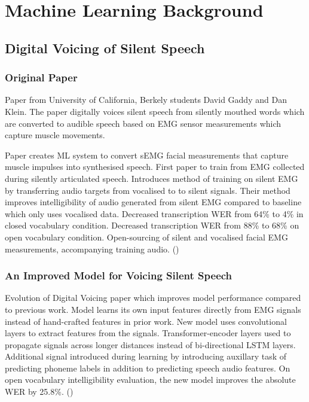 \section{Machine Learning Background}

\subsection{Digital Voicing of Silent Speech}

\subsubsection{Original Paper}

Paper from University of California, Berkely students David Gaddy and Dan Klein.
The paper digitally voices silent speech from silently mouthed words which are
converted to audible speech based on EMG sensor measurements which capture muscle movements.

\iffalse
Other papers have used this approach to FILL REST OF THIS WITH REFERENCED TO SPEECH AND TO TEXT
FROM DIGITAL VOICING, MIT ALTER EGO 2018 SUMMARISED AND 60 PG VERSION AND OTHER SOURCES.
\fi

Paper creates ML system to convert sEMG facial measurements that capture muscle impulses into synthesised speech.
First paper to train from EMG collected during silently articulated speech.
Introduces method of training on silent EMG by transferring audio targets from vocalised to to silent signals.
Their method improves intelligibility of audio generated from silent EMG compared to baseline which only uses vocalised data.
Decreased transcription WER from 64\% to 4\% in closed vocabulary condition.
Decreased transcription WER from 88\% to 68\% on open vocabulary condition.
Open-sourcing of silent and vocalised facial EMG measurements, accompanying training audio.
(\cite{gaddy2020digital})

\subsubsection{An Improved Model for Voicing Silent Speech}

Evolution of Digital Voicing paper which improves model performance compared to previous work.
Model learns its own input features directly from EMG signals instead of hand-crafted features in prior work.
New model uses convolutional layers to extract features from the signals.
Transformer-encoder layers used to propagate signals across longer distances instead of bi-directional LSTM layers.
Additional signal introduced during learning by introducing auxillary task of predicting phoneme labels in addition to predicting speech audio features.
On open vocabulary intelligibility evaluation, the new model improves the absolute WER by 25.8\%.
(\cite{gaddy2021improved})

